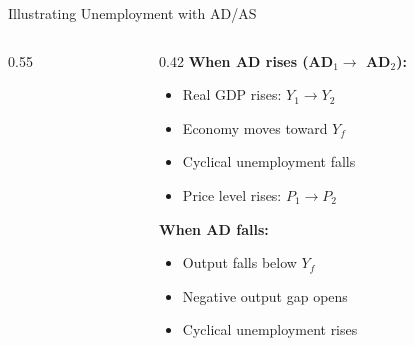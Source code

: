 \documentclass[16pt,aspectratio=169]{beamer}
\begin{document}
\begin{frame}{Illustrating Unemployment with AD/AS}
\begin{columns}
\begin{column}{0.55\textwidth}
\begin{center}
            \end{center}
        \end{column}
        \begin{column}{0.42\textwidth}
            \textbf{When AD rises (AD$_1 \to$ AD$_2$):}
            \begin{itemize}\setlength\itemsep{0.35em}
                \item Real GDP rises: $Y_1 \to Y_2$
                \item Economy moves toward $Y_f$
                \item Cyclical unemployment falls
                \item Price level rises: $P_1 \to P_2$
            \end{itemize}
            \vspace{0.5em}
            \textbf{When AD falls:}
            \begin{itemize}
                \item Output falls below $Y_f$
                \item Negative output gap opens
                \item Cyclical unemployment rises
            \end{itemize}
        \end{column}
    \end{columns}
\end{frame}
\end{document}
